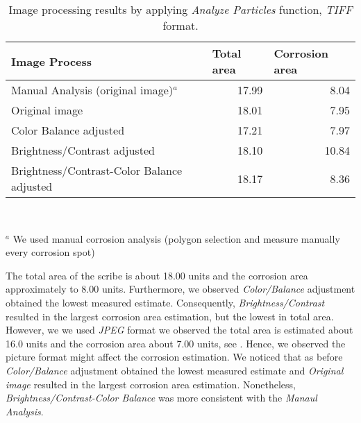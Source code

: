 \documentclass[10pt, fleqn]{article}    %
\begin{document}
\begin{table}[H]
	\centering
	\small
	\caption{Image processing results by applying \textit{Analyze Particles} function, \textit{TIFF} format.}
	\begin{tabular}{|l|r|r|}
		\hline
		Image Process & \multicolumn{1}{l|}{Total area} & \multicolumn{1}{l|}{Corrosion area} \\ \hline
		Manual Analysis (original image)$^a$ & 17.99 & 8.04 \\ \hline
		Original image & 18.01 & 7.95 \\ \hline
		Color Balance adjusted & 17.21 & 7.97 \\ \hline
		Brightness/Contrast adjusted & 18.10 & 10.84 \\ \hline
		Brightness/Contrast-Color Balance adjusted & 18.17 & 8.36 \\ \hline
	\end{tabular} \\
	\begin{flushright}
		\footnotesize{$^a$ We used manual corrosion analysis (polygon selection and measure manually every corrosion spot)}
	\end{flushright}
	\label{tab:ImageProcessing}
\end{table}


The total area of the scribe is about 18.00 units and the corrosion area approximately to 8.00 units. Furthermore, we observed \textit{Color/Balance} adjustment obtained the lowest measured estimate. Consequently, \textit{Brightness/Contrast} resulted in the largest corrosion area estimation, but the lowest in total area. However, we we used \textit{JPEG} format we observed the total area is estimated about 16.0 units and the corrosion area about 7.00 units, see . Hence, we observed the picture format might affect the corrosion estimation.  We noticed that as before \textit{Color/Balance} adjustment obtained the lowest measured estimate and \textit{Original image} resulted in the largest corrosion area estimation. Nonetheless, \textit{Brightness/Contrast-Color Balance} was more consistent with the \textit{Manaul Analysis}.
\end{document}
